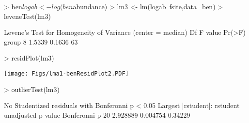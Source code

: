 \documentclass[a4paper]{article}
\begin{document}
\begin{Schunk}
\begin{Sinput}
> ben$logab <- log(ben$abundance)
> lm3 <- lm(logab~fsite,data=ben)
> leveneTest(lm3)
\end{Sinput}
\begin{Soutput}
Levene's Test for Homogeneity of Variance (center = median)
      Df F value Pr(>F)
group  8  1.5339 0.1636
      63               
\end{Soutput}
\end{Schunk}
\begin{Schunk}
\begin{Sinput}
> residPlot(lm3)
\end{Sinput}
\end{Schunk}
\texttt{[image: Figs/lma1-benResidPlot2.PDF]}

\begin{Schunk}
\begin{Sinput}
> outlierTest(lm3)
\end{Sinput}
\begin{Soutput}
No Studentized residuals with Bonferonni p < 0.05
Largest |rstudent|:
   rstudent unadjusted p-value Bonferonni p
20 2.928889           0.004754      0.34229
\end{Soutput}
\end{Schunk}
\end{document}
